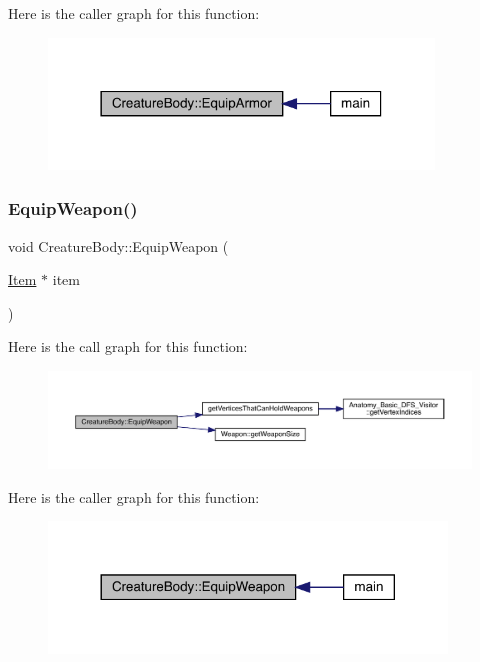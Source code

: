 Here is the caller graph for this function\+:
\nopagebreak
\begin{figure}[H]
\begin{center}
\leavevmode
\includegraphics[width=290pt]{class_creature_body_a5a14d8decef3d1051ac7e9d79a1a4b72_icgraph}
\end{center}
\end{figure}
\mbox{\label{class_creature_body_af329b825db569100370683f7a9b0263c}} 
\subsubsection{\texorpdfstring{Equip\+Weapon()}{EquipWeapon()}}
{\footnotesize\ttfamily void Creature\+Body\+::\+Equip\+Weapon (\begin{DoxyParamCaption}\item[{\mbox{\hyperlink{class_item}{Item}} $\ast$}]{item }\end{DoxyParamCaption})}

Here is the call graph for this function\+:
\nopagebreak
\begin{figure}[H]
\begin{center}
\leavevmode
\includegraphics[width=350pt]{class_creature_body_af329b825db569100370683f7a9b0263c_cgraph}
\end{center}
\end{figure}
Here is the caller graph for this function\+:
\nopagebreak
\begin{figure}[H]
\begin{center}
\leavevmode
\includegraphics[width=300pt]{class_creature_body_af329b825db569100370683f7a9b0263c_icgraph}
\end{center}
\end{figure}
\mbox{\label{class_creature_body_a8feda2cfc35e1b76730a31eb368ffed6}} 

